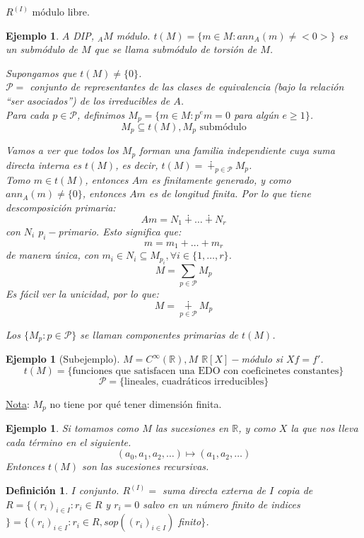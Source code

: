 \documentclass[11pt,a4paper]{article}
\theoremstyle{break}
\newtheorem{example}[theorem]{Ejemplo}
\newtheorem{definition}[theorem]{Definición}
\begin{document}
$R^{(I)}$ módulo libre.


\begin{example}
$A$ DIP, $_{A}M$ módulo.
$t(M) = \{m \in M: ann_{A}(m) \neq <0>\}$ es un submódulo de $M$ que se llama submódulo de torsión de $M$.

Supongamos que $t(M) \neq \{0\}$. \\
$\mathcal{P} =$ conjunto de representantes de las clases de equivalencia (bajo la relación ``ser asociados'') de los irreducibles de $A$. \\
Para cada $p \in \mathcal{P}$, definimos $M_{p} = \{m \in M: p^{e}m = 0$ para algún $e \geq 1\}$.
$$M_{p} \subseteq t(M), M_{p} \text{ submódulo}$$

Vamos a ver que todos los $M_{p}$ forman una familia independiente cuya suma directa interna es $t(M)$, es decir, $t(M) = \dotplus_{p \in \mathcal{P}} M_{p}$. \\
Tomo $m \in t(M)$, entonces $Am$ es finitamente generado, y como $ann_{A}(m) \neq \{0\}$, entonces $Am$ es de longitud finita. Por lo que tiene descomposición primaria:
$$Am = N_{1} \dotplus \dots \dotplus N_{r}$$
con $N_{i}$ $p_{i}-$primario. Esto significa que:
$$m = m_{1} + \dots + m_{r}$$
de manera única, con $m_{i} \in N_{i} \subseteq M_{p_{i}}, \forall i \in \{1, \dots, r\}$.
$$M = \sum_{p \in \mathcal{P}} M_{p}$$
Es fácil ver la unicidad, por lo que:
$$M = \underset{p \in \mathcal{P}}{\dotplus} M_{p}$$

Los $\{M_{p}: p \in \mathcal{P}\}$ se llaman componentes primarias de $t(M)$.
\end{example}

\begin{example}[Subejemplo]
$M = C^{\infty}(\mathbb{R}), M$ $\mathbb{R}[X]-$módulo si $Xf = f'$.
$$t(M) = \{\text{funciones que satisfacen una EDO con coeficinetes constantes}\}$$
$$\mathcal{P} = \{\text{lineales, cuadráticos irreducibles}\}$$
\end{example}

\underline{Nota}: $M_{p}$ no tiene por qué tener dimensión finita.

\begin{example}
Si tomamos como $M$ las sucesiones en $\mathbb{R}$, y como $X$ la que nos lleva cada término en el siguiente.
$$(a_{0}, a_{1}, a_{2}, \dots) \mapsto (a_{1}, a_{2}, \dots)$$
Entonces $t(M)$ son las sucesiones recursivas.
\end{example}

\begin{definition}
$I$ conjunto. $R^{(I)} =$ suma directa externa de $I$ copia de $R = \{(r_{i})_{i \in I}: r_{i} \in R$ y $r_{i} = 0$ salvo en un número finito de indices$\} = \{(r_{i})_{i \in I}: r_{i} \in R, sop((r_{i})_{i \in I})$ finito$\}$.
\end{definition}
\end{document}

